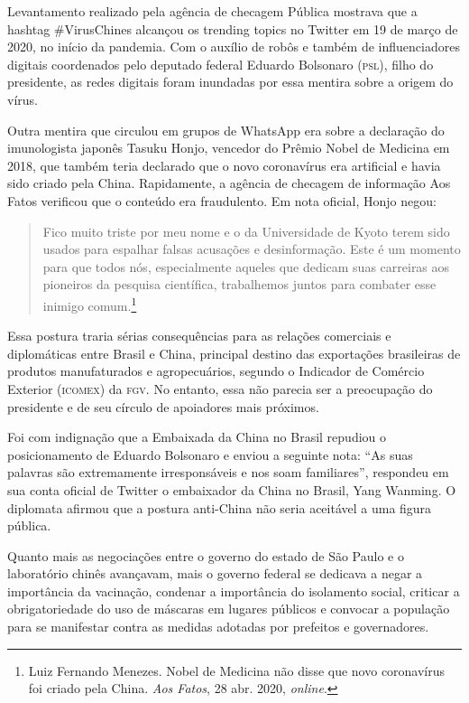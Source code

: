 Levantamento realizado pela agência de checagem Pública mostrava que a
hashtag \#VirusChines alcançou os trending topics no Twitter em 19 de
março de 2020, no início da pandemia. Com o auxílio de robôs e também de
influenciadores digitais coordenados pelo deputado federal Eduardo
Bolsonaro (\textsc{psl}), filho do presidente, as redes digitais foram
inundadas por essa mentira sobre a origem do vírus.

Outra mentira que circulou em grupos de WhatsApp era sobre a declaração
do imunologista japonês Tasuku Honjo, vencedor do Prêmio Nobel de
Medicina em 2018, que também teria declarado que o novo coronavírus era
artificial e havia sido criado pela China. Rapidamente, a agência de
checagem de informação Aos Fatos verificou que o conteúdo era
fraudulento. Em nota oficial, Honjo negou:

\begin{quote}
Fico muito triste por meu nome e o da Universidade de Kyoto terem sido
usados ​​para espalhar falsas acusações e desinformação. Este é um
momento para que todos nós, especialmente aqueles que dedicam suas
carreiras aos pioneiros da pesquisa científica, trabalhemos juntos para
combater esse inimigo comum.\footnote{Luiz Fernando Menezes. Nobel de Medicina não disse que novo coronavírus foi criado pela China. \textit{Aos Fatos}, 28 abr. 2020, \textit{online}.}
\end{quote}

Essa postura traria sérias consequências para as relações comerciais e
diplomáticas entre Brasil e China, principal destino das exportações
brasileiras de produtos manufaturados e agropecuários, segundo o
Indicador de Comércio Exterior (\textsc{icomex}) da \textsc{fgv}. No entanto, essa não parecia ser a preocupação do presidente e de
seu círculo de apoiadores mais próximos.

Foi com indignação que a Embaixada da China no Brasil repudiou o
posicionamento de Eduardo Bolsonaro e enviou a seguinte nota: ``As suas
palavras são extremamente irresponsáveis e nos soam familiares'',
respondeu em sua conta oficial de Twitter o embaixador da China no
Brasil, Yang Wanming. O diplomata afirmou que a postura anti-China não
seria aceitável a uma figura pública.

Quanto mais as negociações entre o governo do estado de São Paulo e o
laboratório chinês avançavam, mais o governo federal se dedicava a negar
a importância da vacinação, condenar a importância do isolamento social,
criticar a obrigatoriedade do uso de máscaras em lugares públicos e
convocar a população para se manifestar contra as medidas adotadas por
prefeitos e governadores.

